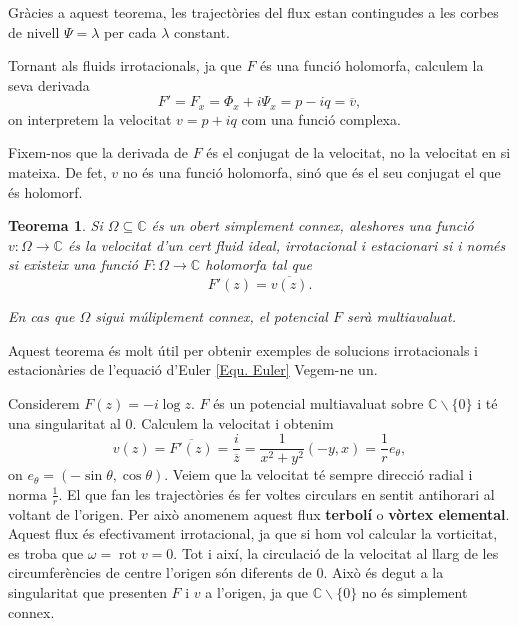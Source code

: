 \documentclass{article}
\numberwithin{equation}{section}
\DeclareMathOperator{\rot}{rot}
\newtheorem{teorema}{Teorema}[section]
\begin{document}
Gr\`{a}cies a aquest teorema, les traject\`{o}ries del flux estan contingudes a les corbes de nivell $\Psi=\lambda$ per cada $\lambda$ constant.

Tornant als fluids irrotacionals, ja que $F$ \'{e}s una funci\'{o} holomorfa, calculem la seva derivada
\[F'=F_x=\Phi_x+i\Psi_x=p-iq=\overline v,\]
on interpretem la velocitat $v=p+iq$ com una funci\'{o} complexa.

Fixem-nos que la derivada de $F$ \'{e}s el conjugat de la velocitat, no la velocitat en si mateixa. De fet, $v$ no \'{e}s una funci\'{o} holomorfa, sin\'{o} que \'{e}s el seu conjugat el que \'{e}s holomorf.

\begin{teorema}
Si $\Omega\subseteq\mathbb{C}$ \'{e}s un obert simplement connex, aleshores una funci\'{o} $v:\Omega\rightarrow\mathbb{C}$ \'{e}s la velocitat d'un cert fluid ideal, irrotacional i estacionari si i nom\'{e}s si existeix una funci\'{o} $F:\Omega\rightarrow\mathbb{C}$ holomorfa tal que
\[F'(z)=\overline{v(z)}.\]

En cas que $\Omega$ sigui m\'{u}liplement connex, el potencial $F$ ser\`{a} multiavaluat.
\end{teorema}

Aquest teorema \'{e}s molt \'{u}til per obtenir exemples de solucions irrotacionals i estacion\`{a}ries de l'equaci\'{o} d'Euler \eqref{Equ. Euler} Vegem-ne un.

Considerem $F(z)=-i\log z$. $F$ \'{e}s un potencial multiavaluat sobre $\mathbb{C}\backslash\{0\}$ i t\'{e} una singularitat al $0$. Calculem la velocitat i obtenim
\begin{equation}\label{Equ. vortex elemental}
v(z)=\overline{F'(z)}=\frac{i}{\overline z}=\frac{1}{x^2+y^2}(-y,x)=\frac{1}{r}e_{\theta},
\end{equation}
on $e_{\theta}=(-\sin\theta,\cos\theta)$. Veiem que la velocitat t\'{e} sempre direcci\'{o} radial i norma $\frac{1}{r}$. El que fan les traject\`{o}ries \'{e}s fer voltes circulars en sentit antihorari al voltant de l'origen. Per aix\`{o} anomenem aquest flux \textbf{terbol\'{i}} o \textbf{v\`{o}rtex elemental}. Aquest flux \'{e}s efectivament irrotacional, ja que si hom vol calcular la vorticitat, es troba que $\omega=\rot v=0$. Tot i aix\'{i}, la circulaci\'{o} de la velocitat al llarg de les circumfer\`{e}ncies de centre l'origen s\'{o}n diferents de $0$. Aix\`{o} \'{e}s degut a la singularitat que presenten $F$ i $v$ a l'origen, ja que $\mathbb{C}\backslash\{0\}$ no \'{e}s simplement connex.
\vspace{3mm}
\end{document}
